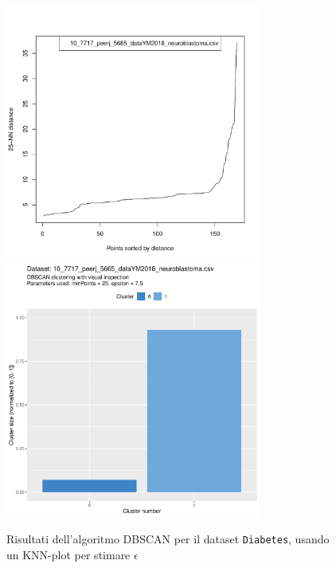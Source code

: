 \documentclass[a4paper, 12pt]{report}
\begin{document}
			\begin{figure}[H]
				\centering
				\includegraphics[width = 0.75\textwidth, height = 0.45\textheight, page = 4]{
					doc/DBSCAN_optimal_MinPts.pdf
				}
				\includegraphics[width = 0.75\textwidth, height = 0.45\textheight, page = 4]{
					results/DBSCAN_visual_comparison.pdf
				}
				\caption{Risultati dell'algoritmo DBSCAN per il dataset
				\texttt{Diabetes}, usando un KNN-plot per stimare $\epsilon$}
				\label{fig:dbscan-extra4}
			\end{figure}
\end{document}
